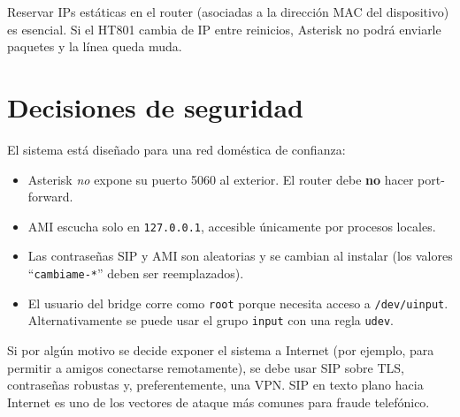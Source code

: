 \begin{tip}
Reservar IPs estáticas en el router (asociadas a la dirección MAC del dispositivo) es esencial. Si el HT801 cambia de IP entre reinicios, Asterisk no podrá enviarle paquetes y la línea queda muda.
\end{tip}

\section{Decisiones de seguridad}

El sistema está diseñado para una red doméstica de confianza:

\begin{itemize}
  \item Asterisk \emph{no} expone su puerto 5060 al exterior. El router debe \textbf{no} hacer port-forward.
  \item AMI escucha solo en \texttt{127.0.0.1}, accesible únicamente por procesos locales.
  \item Las contraseñas SIP y AMI son aleatorias y se cambian al instalar (los valores ``\texttt{cambiame-*}'' deben ser reemplazados).
  \item El usuario del bridge corre como \texttt{root} porque necesita acceso a \texttt{/dev/uinput}. Alternativamente se puede usar el grupo \texttt{input} con una regla \texttt{udev}.
\end{itemize}

\begin{advertencia}
Si por algún motivo se decide exponer el sistema a Internet (por ejemplo, para permitir a amigos conectarse remotamente), se debe usar SIP sobre TLS, contraseñas robustas y, preferentemente, una VPN. SIP en texto plano hacia Internet es uno de los vectores de ataque más comunes para fraude telefónico.
\end{advertencia}

